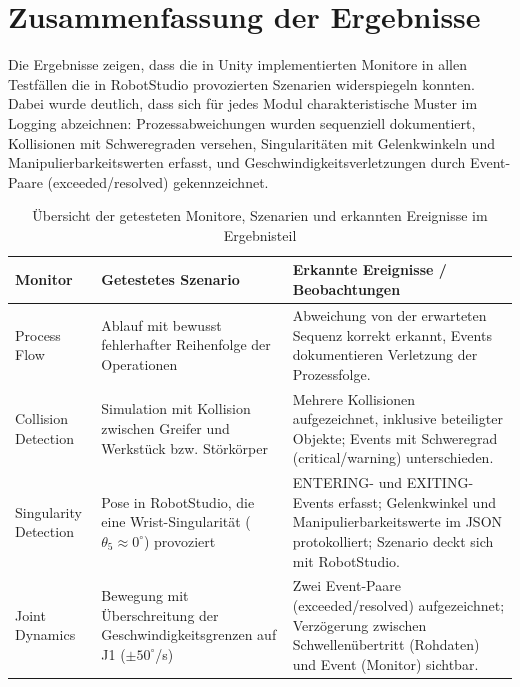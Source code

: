 \section{Zusammenfassung der Ergebnisse}

Die Ergebnisse zeigen, dass die in Unity implementierten Monitore in allen
Testfällen die in RobotStudio provozierten Szenarien widerspiegeln konnten.
Dabei wurde deutlich, dass sich für jedes Modul charakteristische Muster im
Logging abzeichnen: Prozessabweichungen wurden sequenziell dokumentiert,
Kollisionen mit Schweregraden versehen, Singularitäten mit Gelenkwinkeln und
Manipulierbarkeitswerten erfasst, und Geschwindigkeitsverletzungen durch
Event-Paare (exceeded/resolved) gekennzeichnet.\\

\begin{table}[H]
  \centering
  \small
  \begin{tabularx}{\textwidth}{lXX}
    \toprule
    \textbf{Monitor}      & \textbf{Getestetes Szenario}
    & \textbf{Erkannte Ereignisse / Beobachtungen}
    \\
    \midrule
    Process Flow          & Ablauf mit bewusst fehlerhafter
    Reihenfolge der Operationen                                &
    Abweichung von der erwarteten Sequenz korrekt erkannt, Events
    dokumentieren Verletzung der Prozessfolge.
    \\
    \addlinespace
    Collision Detection   & Simulation mit Kollision zwischen Greifer
    und Werkstück bzw. Störkörper                    & Mehrere
    Kollisionen aufgezeichnet, inklusive beteiligter Objekte; Events
    mit Schweregrad (critical/warning) unterschieden.                 \\
    \addlinespace
    Singularity Detection & Pose in RobotStudio, die eine
    Wrist-Singularität ($\theta_{5} \approx 0^\circ$) provoziert &
    ENTERING- und EXITING-Events erfasst; Gelenkwinkel und
    Manipulierbarkeitswerte im JSON protokolliert; Szenario deckt
    sich mit RobotStudio. \\
    \addlinespace
    Joint Dynamics        & Bewegung mit Überschreitung der
    Geschwindigkeitsgrenzen auf J1 ($\pm 50^\circ$/s)          & Zwei
    Event-Paare (exceeded/resolved) aufgezeichnet; Verzögerung
    zwischen Schwellenübertritt (Rohdaten) und Event (Monitor)
    sichtbar.       \\
    \bottomrule
  \end{tabularx}
  \caption{Übersicht der getesteten Monitore, Szenarien und erkannten
  Ereignisse im Ergebnisteil}
  \label{tab:monitor_overview}
\end{table}

